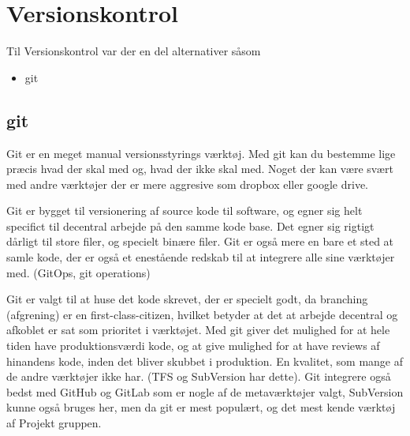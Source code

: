 \section{Versionskontrol}

Til Versionskontrol var der en del alternativer såsom

\begin{itemize}
    \item git
\end{itemize}

\subsection{git}

Git er en meget manual versionsstyrings værktøj. Med git kan du bestemme lige præcis hvad der skal med og, hvad der ikke skal med. Noget der kan være svært med andre værktøjer der er mere aggresive som dropbox eller google drive.

Git er bygget til versionering af source kode til software, og egner sig helt specifict til decentral arbejde på den samme kode base. Det egner sig rigtigt dårligt til store filer, og specielt binære filer. Git er også mere en bare et sted at samle kode, der er også et enestående redskab til at integrere alle sine værktøjer med. (GitOps, git operations)

Git er valgt til at huse det kode skrevet, der er specielt godt, da branching (afgrening) er en first-class-citizen, hvilket betyder at det at arbejde decentral og afkoblet er sat som prioritet i værktøjet. Med git giver det mulighed for at hele tiden have produktionsværdi kode, og at give mulighed for at have reviews af hinandens kode, inden det bliver skubbet i produktion. En kvalitet, som mange af de andre værktøjer ikke har. (TFS og SubVersion har dette). Git integrere også bedst med GitHub og GitLab som er nogle af de metaværktøjer valgt, SubVersion kunne også bruges her, men da git er mest populært, og det mest kende værktøj af Projekt gruppen.